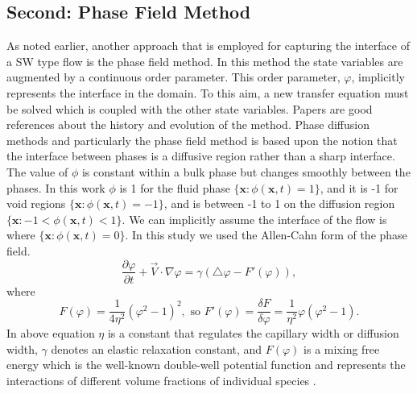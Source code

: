 \documentclass[review]{elsarticle}
\begin{document}
\subsection{Second: Phase Field Method} \label{phase field}
As noted earlier, another approach that is employed 
for capturing the interface of a SW type flow is the phase field method.
In this method the state variables are augmented by a continuous
order parameter. This order parameter, $\varphi$, 
implicitly represents the interface in the domain. To this aim, a new transfer equation must be solved which is coupled with the other state variables. 
Papers \cite{Chen2002,Anderson1998,Boettinger2002,Kim2012} are good references about the history and evolution of the method.
Phase diffusion methods and particularly the phase field method is based upon the notion that the interface between phases is a diffusive region rather than a sharp interface. 
The value of $\phi$ is constant within a bulk phase but changes smoothly between the phases. In this work $\phi$ is 1 for the fluid phase $ \lbrace \textbf{x}: \phi(\textbf{x},t)=1 \rbrace  $, 
and it is -1 for void regions $ \lbrace \textbf{x}: \phi(\textbf{x},t)=-1 \rbrace  $, and is between -1 to 1 on the diffusion region $ \lbrace \textbf{x}: -1 < \phi(\textbf{x},t) < 1 \rbrace  $. 
We can implicitly assume the interface of the flow is where $ \lbrace \textbf{x}: \phi(\textbf{x},t)= 0 \rbrace  $.
In this study we used the Allen-Cahn form of the phase field. 
\begin{equation} 
        \label{allencahn}
        \frac{\partial \varphi }{\partial t} + \overrightarrow{V}\cdot \nabla \varphi = 
        \gamma (\bigtriangleup\varphi -F'(\varphi)),
\end{equation}
where
\begin{equation} 
        \label{fprime}
        F(\varphi)=\frac{1}{4\eta^2} (\varphi^2-1)^2 ,\text{\ so \ \ } F'(\varphi)= \frac{\delta F}{\delta \varphi} = \frac{1}{\eta^2} \varphi (\varphi^2 -1).
\end{equation}
In above equation $\eta$ is a constant that regulates the capillary width or diffusion width, $ \gamma $ denotes an elastic relaxation constant, and $F(\varphi)$ is 
a mixing free energy which is the well-known double-well potential function and represents the interactions of different volume fractions of individual species \cite{Bronsard1990,Larson1999}.
\end{document}
